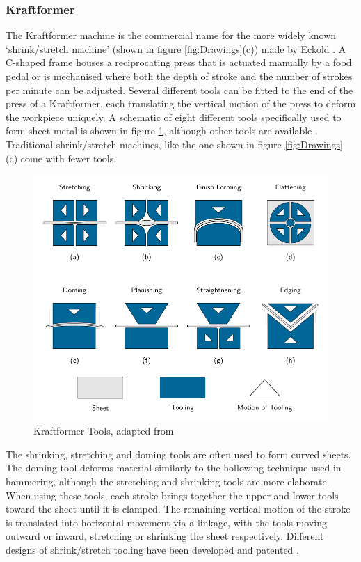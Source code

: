 \subsubsection{Kraftformer} \label{sec:ManualKraftformer}

The Kraftformer machine is the commercial name for the more widely known `shrink/stretch machine' (shown in figure \ref{fig:Drawings}(c)) made by Eckold \citep{Unknown2020ECKOLDBrochure}. A C-shaped frame houses a reciprocating press that is actuated manually by a food pedal or is mechanised where both the depth of stroke and the number of strokes per minute can be adjusted. Several different tools can be fitted to the end of the press of a Kraftformer, each translating the vertical motion of the press to deform the workpiece uniquely. A schematic of eight different tools specifically used to form sheet metal is shown in figure \ref{fig:Kraftformer}, although other tools are available \citep{Unknown2020ECKOLDBrochure}. Traditional shrink/stretch machines, like the one shown in figure \ref{fig:Drawings} (c) come with fewer tools.

\begin{figure}[h]
    \centering
    \includegraphics[width=0.7\linewidth]{Images/KraftformingTools4x2.pdf}
    \caption{Kraftformer Tools, adapted from \citep{Unknown2020ECKOLDBrochure}}
    \label{fig:Kraftformer}
\end{figure}

The shrinking, stretching and doming tools are often used to form curved sheets. The doming tool deforms material similarly to the hollowing technique used in hammering, although the stretching and shrinking tools are more elaborate. When using these tools, each stroke brings together the upper and lower tools toward the sheet until it is clamped. The remaining vertical motion of the stroke is translated into horizontal movement via a linkage, with the tools moving outward or inward, stretching or shrinking the sheet respectively. Different designs of shrink/stretch tooling have been developed and patented \citep{Joyner1943SheetMachine,Rusch2011ShrinkerMachine,Eckold1950ToolElements,EckoldWalter1954ApparatusProfiles}.

